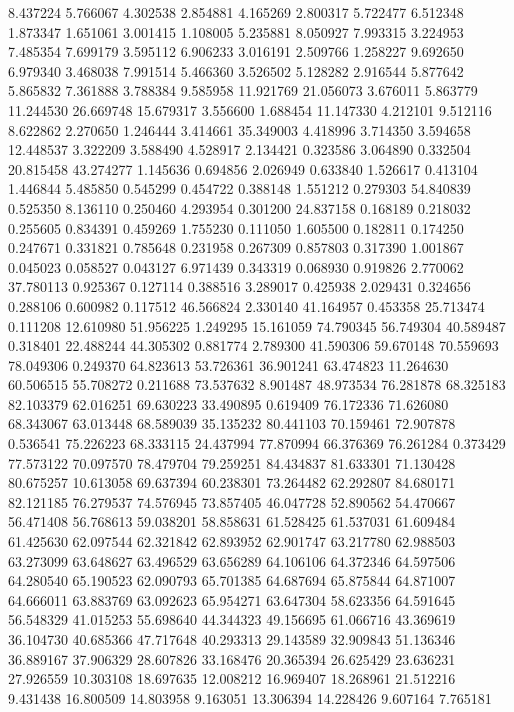 8.437224
5.766067
4.302538
2.854881
4.165269
2.800317
5.722477
6.512348
1.873347
1.651061
3.001415
1.108005
5.235881
8.050927
7.993315
3.224953
7.485354
7.699179
3.595112
6.906233
3.016191
2.509766
1.258227
9.692650
6.979340
3.468038
7.991514
5.466360
3.526502
5.128282
2.916544
5.877642
5.865832
7.361888
3.788384
9.585958
11.921769
21.056073
3.676011
5.863779
11.244530
26.669748
15.679317
3.556600
1.688454
11.147330
4.212101
9.512116
8.622862
2.270650
1.246444
3.414661
35.349003
4.418996
3.714350
3.594658
12.448537
3.322209
3.588490
4.528917
2.134421
0.323586
3.064890
0.332504
20.815458
43.274277
1.145636
0.694856
2.026949
0.633840
1.526617
0.413104
1.446844
5.485850
0.545299
0.454722
0.388148
1.551212
0.279303
54.840839
0.525350
8.136110
0.250460
4.293954
0.301200
24.837158
0.168189
0.218032
0.255605
0.834391
0.459269
1.755230
0.111050
1.605500
0.182811
0.174250
0.247671
0.331821
0.785648
0.231958
0.267309
0.857803
0.317390
1.001867
0.045023
0.058527
0.043127
6.971439
0.343319
0.068930
0.919826
2.770062
37.780113
0.925367
0.127114
0.388516
3.289017
0.425938
2.029431
0.324656
0.288106
0.600982
0.117512
46.566824
2.330140
41.164957
0.453358
25.713474
0.111208
12.610980
51.956225
1.249295
15.161059
74.790345
56.749304
40.589487
0.318401
22.488244
44.305302
0.881774
2.789300
41.590306
59.670148
70.559693
78.049306
0.249370
64.823613
53.726361
36.901241
63.474823
11.264630
60.506515
55.708272
0.211688
73.537632
8.901487
48.973534
76.281878
68.325183
82.103379
62.016251
69.630223
33.490895
0.619409
76.172336
71.626080
68.343067
63.013448
68.589039
35.135232
80.441103
70.159461
72.907878
0.536541
75.226223
68.333115
24.437994
77.870994
66.376369
76.261284
0.373429
77.573122
70.097570
78.479704
79.259251
84.434837
81.633301
71.130428
80.675257
10.613058
69.637394
60.238301
73.264482
62.292807
84.680171
82.121185
76.279537
74.576945
73.857405
46.047728
52.890562
54.470667
56.471408
56.768613
59.038201
58.858631
61.528425
61.537031
61.609484
61.425630
62.097544
62.321842
62.893952
62.901747
63.217780
62.988503
63.273099
63.648627
63.496529
63.656289
64.106106
64.372346
64.597506
64.280540
65.190523
62.090793
65.701385
64.687694
65.875844
64.871007
64.666011
63.883769
63.092623
65.954271
63.647304
58.623356
64.591645
56.548329
41.015253
55.698640
44.344323
49.156695
61.066716
43.369619
36.104730
40.685366
47.717648
40.293313
29.143589
32.909843
51.136346
36.889167
37.906329
28.607826
33.168476
20.365394
26.625429
23.636231
27.926559
10.303108
18.697635
12.008212
16.969407
18.268961
21.512216
9.431438
16.800509
14.803958
9.163051
13.306394
14.228426
9.607164
7.765181
